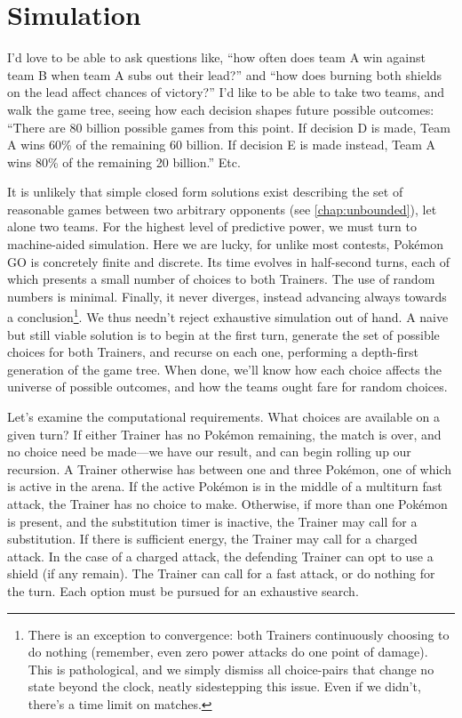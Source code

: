 \chapter{Simulation}
\label{chap:simul}
I'd love to be able to ask questions like, ``how often does team A win against
  team B when team A subs out their lead?''
  and ``how does burning both shields on the lead affect chances of victory?''
I'd like to be able to take two teams, and walk the game tree, seeing how
  each decision shapes future possible outcomes: ``There are 80 billion
  possible games from this point. If decision D is made, Team A
  wins 60\% of the remaining 60 billion. If decision E is made instead,
  Team A wins 80\% of the remaining 20 billion.'' Etc.

It is unlikely that simple closed form solutions exist describing
 the set of reasonable games between two arbitrary opponents (see \autoref{chap:unbounded}),
 let alone two teams.
For the highest level of predictive power, we must turn to machine-aided simulation.
Here we are lucky, for unlike most contests, Pokémon GO is concretely finite and discrete.
Its time evolves in half-second turns, each of which presents a small number of choices
  to both Trainers.
The use of random numbers is minimal.
Finally, it never diverges, instead advancing always towards a conclusion\footnote{There
  is an exception to convergence: both Trainers continuously choosing to do nothing (remember,
  even zero power attacks do one point of damage). This is pathological, and we
  simply dismiss all choice-pairs that change no state beyond the clock, neatly sidestepping this issue.
  Even if we didn't, there's a time limit on matches.}.
We thus needn't reject exhaustive simulation out of hand.
A naive but still viable solution is to begin at the first turn, generate the set
  of possible choices for both Trainers, and recurse on each one, performing
  a depth-first generation of the game tree.
When done, we'll know how each choice affects the universe of possible outcomes,
  and how the teams ought fare for random choices.

Let's examine the computational requirements.
What choices are available on a given turn?
If either Trainer has no Pokémon remaining, the match is over, and no choice
  need be made---we have our result, and can begin rolling up our recursion.
A Trainer otherwise has between one and three Pokémon, one of which is active
  in the arena.
If the active Pokémon is in the middle of a multiturn fast attack, the
  Trainer has no choice to make.
Otherwise, if more than one Pokémon is present, and the substitution timer is
  inactive, the Trainer may call for a substitution.
If there is sufficient energy, the Trainer may call for a charged attack.
In the case of a charged attack, the defending Trainer can opt to use a shield (if any remain).
The Trainer can call for a fast attack, or do nothing for the turn.
Each option must be pursued for an exhaustive search.

